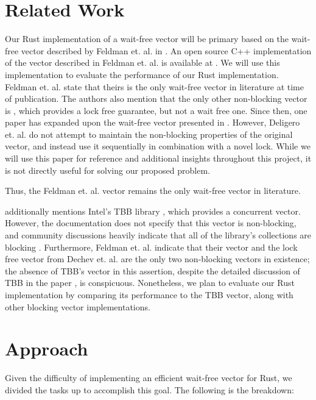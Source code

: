 \documentclass[conference]{IEEEtran}
\begin{document}
\section{Related Work}

Our Rust implementation of a wait-free vector will be primary based on the wait-free vector described by Feldman et. al. in \cite{main}. An open source C++ implementation of the vector described in Feldman et. al. \cite{main} is available at \cite{cpp}. We will use this implementation to evaluate the performance of our Rust implementation.
Feldman et. al. \cite{main} state that theirs is the only wait-free vector in literature at time of publication. The authors \cite{main} also mention that the only other non-blocking vector is \cite{lfvec}, which provides a lock free guarantee, but not a wait free one. Since then, one paper \cite{mrlock} has expanded upon the wait-free vector presented in \cite{main}. However, Deligero et. al. \cite{mrlock} do not attempt to maintain the non-blocking properties of the original vector, and instead use it sequentially in combination with a novel lock. While we will use this paper for reference and additional insights throughout this project, it is not directly useful for solving our proposed problem. 

Thus, the Feldman et. al. \cite{main} vector remains the only wait-free vector in literature.

\cite{main} additionally mentions Intel’s TBB library \cite{tbb}, which provides a concurrent vector. However, the documentation does not specify that this vector is non-blocking, and community discussions heavily indicate that all of the library’s collections are blocking \cite{tbbcomm}. Furthermore, Feldman et. al. \cite{main} indicate that their vector and the lock free vector from Dechev et. al. \cite{lfvec} are the only two non-blocking vectors in existence; the absence of TBB’s vector in this assertion, despite the detailed discussion of TBB in the paper \cite{main}, is conspicuous. Nonetheless, we plan to evaluate our Rust implementation by comparing its performance to the TBB vector, along with other blocking vector implementations. 

\section{Approach}

Given the difficulty of implementing an efficient wait-free vector for Rust, we divided the tasks up to accomplish this goal. The following is the breakdown:
\end{document}
